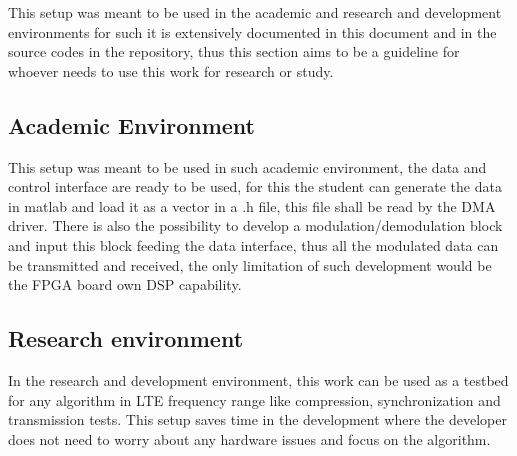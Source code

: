 This setup was meant to be used in the academic and research and development
environments for such it is extensively documented in this document and in the
source codes in the repository, thus this section aims to be a guideline for
whoever needs to use this work for research or study.

\subsection{Academic Environment}

This setup was meant to be used in such academic environment, the data and control
interface are ready to be used, for this the student can generate the data in
matlab and load it as a vector in a .h file, this file shall be read by the DMA
driver.
There is also the possibility to develop a modulation/demodulation block
and input this block feeding the data interface, thus all the modulated data can
be transmitted and received, the only limitation of such development would be the
FPGA board own DSP capability.

\subsection{Research environment}

In the research and development environment, this work can be used as a testbed
for any algorithm in LTE frequency range like compression, synchronization and
transmission tests. This setup saves time in the development where the developer
does not need to worry about any hardware issues and focus on the algorithm.
